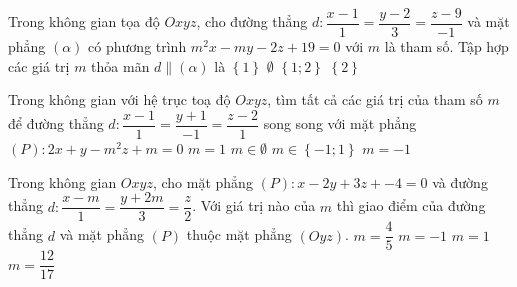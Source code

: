 \begin{ex}%
Trong không gian tọa độ $Oxyz$, cho đường thẳng $d:\dfrac{x-1}{1}=\dfrac{y-2}{3}=\dfrac{z-9}{-1}$ và mặt phẳng $(\alpha)$ có phương trình $m^2x-my-2z+19=0$ với $m$ là tham số. Tập hợp các giá trị $m$ thỏa mãn $d \parallel (\alpha)$ là
\choice
{$\left\{1\right\}$}
{$\emptyset$}
{$\left\{1;2\right\}$}
{\True $\left\{2\right\}$}
\end{ex}

\begin{ex}%
Trong không gian với hệ trục toạ độ $Oxyz$, tìm tất cả các giá trị của tham số $m$ để đường thẳng $d:\dfrac{x-1}{1}=\dfrac{y+1}{-1}=\dfrac{z-2}{1}$ song song với mặt phẳng $(P):2x+y-m^2z+m=0$
\choice
{$m=1$}
{$m\in\emptyset$}
{$m\in\left\{-1;1\right\}$}
{\True $m=-1$}
\end{ex}

\begin{ex}%
Trong không gian $Oxyz$, cho mặt phẳng $(P):x-2y+3z+-4=0$ và đường thẳng $d: \dfrac{x-m}{1}=\dfrac{y+2m}{3}=\dfrac{z}{2}$. Với giá trị nào của $m$ thì giao điểm của đường thẳng $d$ và mặt phẳng $(P)$ thuộc mặt phẳng $(Oyz)$.
\choice
{$m=\dfrac{4}{5}$}
{$m=-1$}
{\True $m=1$}
{$m=\dfrac{12}{17}$}
\end{ex}

